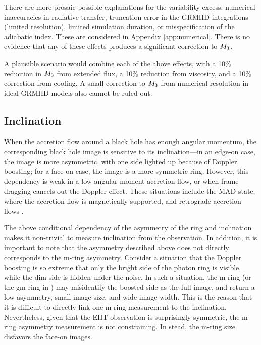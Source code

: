 There are more prosaic possible explanations for the variability excess: numerical inaccuracies in radiative transfer, truncation error in the GRMHD integrations (limited resolution), limited simulation duration, or misspecification of the adiabatic index.  These are considered in Appendix \ref{app:numerical}.  There is no evidence that any of these effects produces a significant correction to $M_{3}$.

A plausible scenario would combine each of the above effects, with a 10\% reduction in $M_{3}$ from extended flux, a 10\% reduction from viscosity, and a 10\% correction from cooling.  A small correction to $M_{3}$ from numerical resolution in ideal GRMHD models also cannot be ruled out.  


\subsection{Inclination}


When the accretion flow around a black hole has enough angular momentum, the corresponding black hole image is sensitive to its inclination---in an edge-on case, the image is more asymmetric, with one side lighted up because of Doppler boosting; for a face-on case, the image is a more symmetric ring.
However, this dependency is weak in a low angular moment accretion flow, or when frame dragging cancels out the Doppler effect. These situations include the MAD state, where the accretion flow is magnetically supported, and retrograde accretion flows \citep{2021arXiv210503424M}.

The above conditional dependency of the asymmetry of the ring and
inclination makes it non-trivial to measure inclination from the
observation.
In addition, it is important to note that the asymmetry described
above does not directly corresponds to the m-ring asymmetry.
Consider a situation that the Doppler boosting is so extreme that only
the bright side of the photon ring is visible, while the dim side is
hidden under the noise.
In such a situation, the m-ring (or the gm-ring in )
may misidentify the boosted side as the full image, and return a low
asymmetry, small image size, and wide image width.
This is the reason that it is difficult to directly link one m-ring
measurement to the inclination.
Nevertheless, given that the EHT observation is surprisingly
symmetric, the m-ring asymmetry measurement is not constraining.
In stead, the m-ring size disfavors the face-on images.

